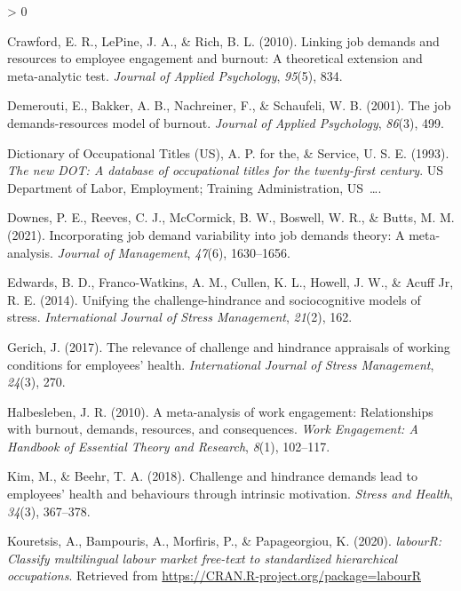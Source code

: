 \documentclass[
  english,
  man]{apa6}
\newlength{\cslhangindent}
\newenvironment{CSLReferences}[2] %
 {%
  \setlength{\parindent}{0pt}
  \ifodd #1 \everypar{\setlength{\hangindent}{\cslhangindent}}\ignorespaces\fi
  \ifnum #2 > 0
  \setlength{\parskip}{#2\baselineskip}
  \fi
 }%
 {}
\begin{document}
\begin{CSLReferences}{1}{0}
\leavevmode\hypertarget{ref-crawford2010linking}{}%
Crawford, E. R., LePine, J. A., \& Rich, B. L. (2010). Linking job demands and resources to employee engagement and burnout: A theoretical extension and meta-analytic test. \emph{Journal of Applied Psychology}, \emph{95}(5), 834.

\leavevmode\hypertarget{ref-demerouti2001job}{}%
Demerouti, E., Bakker, A. B., Nachreiner, F., \& Schaufeli, W. B. (2001). The job demands-resources model of burnout. \emph{Journal of Applied Psychology}, \emph{86}(3), 499.

\leavevmode\hypertarget{ref-advisory1993new}{}%
Dictionary of Occupational Titles (US), A. P. for the, \& Service, U. S. E. (1993). \emph{The new DOT: A database of occupational titles for the twenty-first century}. US Department of Labor, Employment; Training Administration, US~\ldots.

\leavevmode\hypertarget{ref-downes2021incorporating}{}%
Downes, P. E., Reeves, C. J., McCormick, B. W., Boswell, W. R., \& Butts, M. M. (2021). Incorporating job demand variability into job demands theory: A meta-analysis. \emph{Journal of Management}, \emph{47}(6), 1630--1656.

\leavevmode\hypertarget{ref-edwards2014unifying}{}%
Edwards, B. D., Franco-Watkins, A. M., Cullen, K. L., Howell, J. W., \& Acuff Jr, R. E. (2014). Unifying the challenge-hindrance and sociocognitive models of stress. \emph{International Journal of Stress Management}, \emph{21}(2), 162.

\leavevmode\hypertarget{ref-gerich2017relevance}{}%
Gerich, J. (2017). The relevance of challenge and hindrance appraisals of working conditions for employees' health. \emph{International Journal of Stress Management}, \emph{24}(3), 270.

\leavevmode\hypertarget{ref-halbesleben2010meta}{}%
Halbesleben, J. R. (2010). A meta-analysis of work engagement: Relationships with burnout, demands, resources, and consequences. \emph{Work Engagement: A Handbook of Essential Theory and Research}, \emph{8}(1), 102--117.

\leavevmode\hypertarget{ref-kim2018challenge}{}%
Kim, M., \& Beehr, T. A. (2018). Challenge and hindrance demands lead to employees' health and behaviours through intrinsic motivation. \emph{Stress and Health}, \emph{34}(3), 367--378.

\leavevmode\hypertarget{ref-R-labourR}{}%
Kouretsis, A., Bampouris, A., Morfiris, P., \& Papageorgiou, K. (2020). \emph{labourR: Classify multilingual labour market free-text to standardized hierarchical occupations}. Retrieved from \url{https://CRAN.R-project.org/package=labourR}


\end{CSLReferences}
\end{document}
